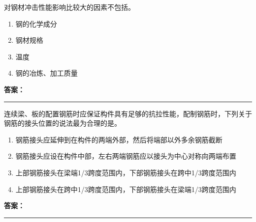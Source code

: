\documentclass[UTF8,fontset=fandol,11pt]{ctexart}
\newcommand{\answerline}{\textcolor{answerred}{\rule{2.4cm}{0.7pt}}}
\begin{document}
\begin{quizbox}[title={乱序第 164 题｜第四章混凝土结构工程}]

对钢材冲击性能影响比较大的因素不包括。\\

\begin{enumerate}[label=\Alph*.]

\item 钢的化学成分

\item 钢材规格

\item 温度

\item 钢的冶炼、加工质量

\end{enumerate}

\textbf{\textcolor{answerred}{答案：}} \answerline

\end{quizbox}

\vspace{0.2em}

\begin{quizbox}[title={乱序第 165 题｜第四章混凝土结构工程}]

连续梁、板的配置钢筋时应保证构件具有足够的抗拉性能，配制钢筋时，下列关于钢筋的接头位置的说法最为合理的是。\\

\begin{enumerate}[label=\Alph*.]

\item 钢筋接头应延伸到在构件的两端外部，然后将端部以外多余钢筋截断

\item 钢筋接头应设在构件中部，左右两端钢筋应以接头为中心对称向两端布置

\item 上部钢筋接头在梁端1/3跨度范围内，下部钢筋接头在跨中1/3跨度范围内

\item 上部钢筋接头在跨中1/3跨度范围内，下部钢筋接头在梁端1/3跨度范围内

\end{enumerate}

\textbf{\textcolor{answerred}{答案：}} \answerline

\end{quizbox}

\vspace{0.2em}
\end{document}
